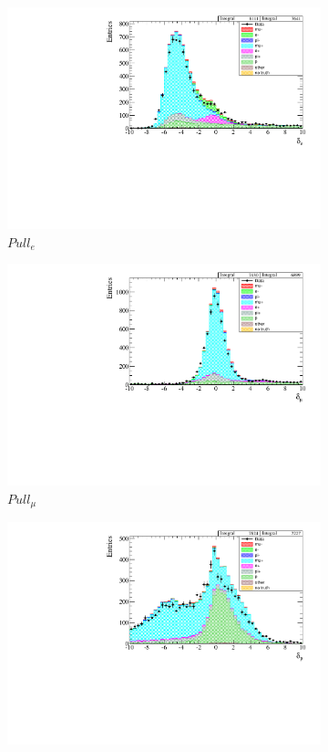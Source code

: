 \begin{figure}[h]
	\begin{subfigure}[t]{0.32\textwidth}
		\includegraphics[width=\textwidth]{figures/numu/Cuts/numubar/presel_pullele_part}
		\caption{$Pull_e$}
	\end{subfigure}
	\begin{subfigure}[t]{0.32\textwidth}
		\includegraphics[width=\textwidth]{figures/numu/Cuts/numubar/presel_pullmu_part}
		\caption{$Pull_\mu$}
	\end{subfigure}
	\begin{subfigure}[t]{0.32\textwidth}
		\includegraphics[width=\textwidth]{figures/numu/Cuts/numubar/presel_pullp_part}

\end{subfigure}
\end{figure}
